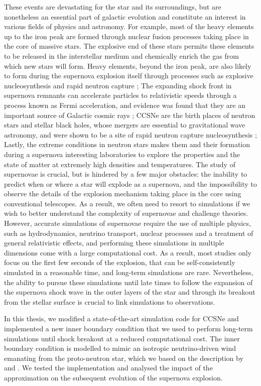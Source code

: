 These events are devastating for the star and its surroundings, but are nonetheless an essential part of galactic evolution and constitute an interest in various fields of physics and astronomy. For example, most of the heavy elements up to the iron peak are formed through nuclear fusion processes taking place in the core of massive stars. The explosive end of these stars permits these elements to be released in the interstellar medium and chemically enrich the gas from which new stars will form. Heavy elements, beyond the iron peak, are also likely to form during the supernova explosion itself through processes such as explosive nucleosynthesis and rapid neutron capture \citep{Arcones2023}; The expanding shock front in supernova remnants can accelerate particles to relativistic speeds through a process known as Fermi acceleration, and evidence was found that they are an important source of Galactic cosmic rays \citep{Ackermann2013}; CCSNe are the birth places of neutron stars and stellar black holes, whose mergers are essential to gravitational wave astronomy, and were shown to be a site of rapid neutron capture nucleosynthesis \citep{Abbott2017}; Lastly, the extreme conditions in neutron stars makes them and their formation during a supernova interesting laboratories to explore the properties and the state of matter at extremely high densities and temperatures. The study of supernovae is crucial, but is hindered by a few major obstacles: the inability to predict when or where a star will explode as a supernova, and the impossibility to observe the details of the explosion mechanism taking place in the core using conventional telescopes. As a result, we often need to resort to simulations if we wish to better understand the complexity of supernovae and challenge theories. However, accurate simulations of supernovae require the use of multiple physics, such as hydrodynamics, neutrino transport, nuclear processes and a treatment of general relativistic effects, and performing these simulations in multiple dimensions come with a large computational cost. As a result, most studies only focus on the first few seconds of the explosion, that can be self-consistently simulated in a reasonable time, and long-term simulations are rare. Nevertheless, the ability to pursue these simulations until late times to follow the expansion of the supernova shock wave in the outer layers of the star and through its breakout from the stellar surface is crucial to link simulations to observations.

In this thesis, we modified a state-of-the-art simulation code for CCSNe and implemented a new inner boundary condition that we used to perform long-term simulations until shock breakout at a reduced computational cost. The inner boundary condition is modelled to mimic an isotropic neutrino-driven wind emanating from the proto-neutron star, which we based on the description by \cite{Wongwathanarat2015} and \cite{Stockinger2020}. We tested the implementation and analysed the impact of the approximation on the subsequent evolution of the supernova explosion.

